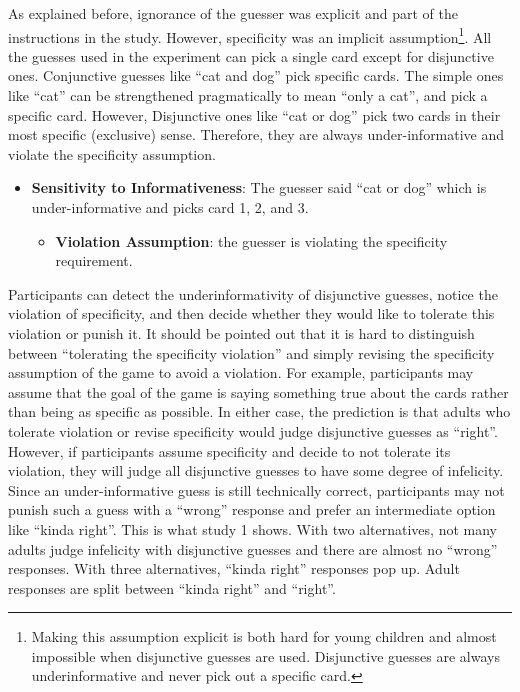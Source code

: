 \documentclass[man]{apa6}
\providecommand{\tightlist}{%
  \setlength{\itemsep}{0pt}\setlength{\parskip}{0pt}}
\theoremstyle{definition}
\theoremstyle{definition}
\theoremstyle{definition}
\theoremstyle{remark}
\begin{document}
As explained before, ignorance of the guesser was explicit and part of
the instructions in the study. However, specificity was an implicit
assumption\footnote{Making this assumption explicit is both hard for
  young children and almost impossible when disjunctive guesses are
  used. Disjunctive guesses are always underinformative and never pick
  out a specific card.}. All the guesses used in the experiment can pick
a single card except for disjunctive ones. Conjunctive guesses like
\enquote{cat and dog} pick specific cards. The simple ones like
\enquote{cat} can be strengthened pragmatically to mean \enquote{only a
cat}, and pick a specific card. However, Disjunctive ones like
\enquote{cat or dog} pick two cards in their most specific (exclusive)
sense. Therefore, they are always under-informative and violate the
specificity assumption.

\begin{itemize}
\tightlist
\item
  \textbf{Sensitivity to Informativeness}: The guesser said \enquote{cat
  or dog} which is under-informative and picks card 1, 2, and 3.

  \begin{itemize}
  \tightlist
  \item
    \textbf{Violation Assumption}: the guesser is violating the
    specificity requirement.
  \end{itemize}
\end{itemize}

Participants can detect the underinformativity of disjunctive guesses,
notice the violation of specificity, and then decide whether they would
like to tolerate this violation or punish it. It should be pointed out
that it is hard to distinguish between \enquote{tolerating the
specificity violation} and simply revising the specificity assumption of
the game to avoid a violation. For example, participants may assume that
the goal of the game is saying something true about the cards rather
than being as specific as possible. In either case, the prediction is
that adults who tolerate violation or revise specificity would judge
disjunctive guesses as \enquote{right}. However, if participants assume
specificity and decide to not tolerate its violation, they will judge
all disjunctive guesses to have some degree of infelicity. Since an
under-informative guess is still technically correct, participants may
not punish such a guess with a \enquote{wrong} response and prefer an
intermediate option like \enquote{kinda right}. This is what study 1
shows. With two alternatives, not many adults judge infelicity with
disjunctive guesses and there are almost no \enquote{wrong} responses.
With three alternatives, \enquote{kinda right} responses pop up. Adult
responses are split between \enquote{kinda right} and \enquote{right}.
\end{document}
